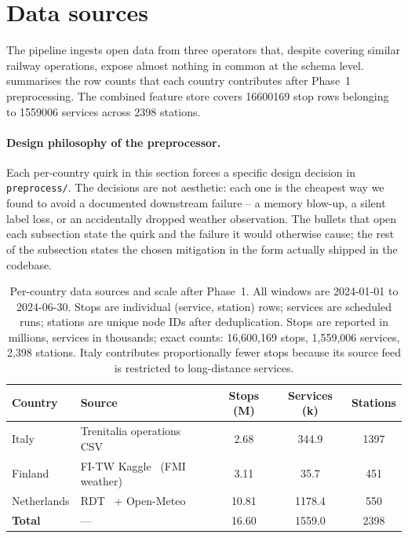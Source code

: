 \section{Data sources}
\label{sec:data}

The pipeline ingests open data from three operators that, despite covering similar railway operations, expose almost nothing in common at the schema level.  summarises the row counts that each country contributes after Phase~1 preprocessing. The combined feature store covers \num{16600169} stop rows belonging to \num{1559006} services across \num{2398} stations.

\paragraph{Design philosophy of the preprocessor.} Each per-country quirk in this section forces a specific design decision in \texttt{preprocess/}. The decisions are not aesthetic: each one is the cheapest way we found to avoid a documented downstream failure -- a memory blow-up, a silent label loss, or an accidentally dropped weather observation. The bullets that open each subsection state the quirk and the failure it would otherwise cause; the rest of the subsection states the chosen mitigation in the form actually shipped in the codebase.

\begin{table}[H]
    \centering
    \caption{Per-country data sources and scale after Phase~1. All windows are 2024-01-01 to 2024-06-30. Stops are individual (service, station) rows; services are scheduled runs; stations are unique node IDs after deduplication. Stops are reported in millions, services in thousands; exact counts: 16{,}600{,}169 stops, 1{,}559{,}006 services, 2{,}398 stations. Italy contributes proportionally fewer stops because its source feed is restricted to long-distance services.}
    \label{tab:data-sources}
    \small
    \setlength{\tabcolsep}{8pt}
    \begin{tabularx}{\textwidth}{l X
        S[table-format=2.2, round-mode=places, round-precision=2]
        S[table-format=4.1, round-mode=places, round-precision=1]
        S[table-format=4.0, group-minimum-digits=4]}
        \toprule
        Country & Source & {Stops (M)} & {Services (k)} & {Stations} \\
        \midrule
        Italy        & Trenitalia operations CSV~\cite{trenitalia2025figshare}                       &  2.68 &  344.9 & 1397 \\
        Finland      & FI-TW Kaggle~\cite{borin2025fitw} (FMI weather)                                 &  3.11 &   35.7 &  451 \\
        Netherlands  & RDT~\cite{rdt2024opendata} + Open-Meteo~\cite{zippenfenig2023openmeteo}         & 10.81 & 1178.4 &  550 \\
        \midrule
        \textbf{Total} & ---                                                                          & 16.60 & 1559.0 & 2398 \\
        \bottomrule
    \end{tabularx}
\end{table}

